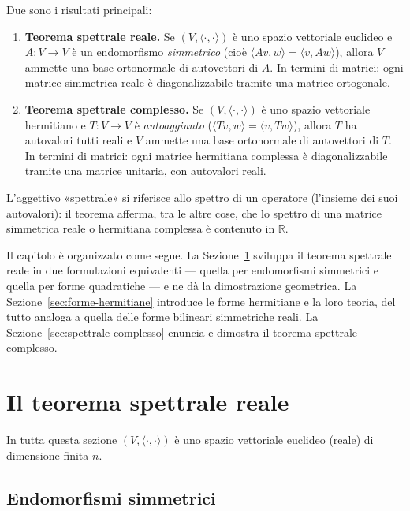 \documentclass[11pt, a4paper]{book}
\theoremstyle{definition}
\theoremstyle{plain}
\theoremstyle{remark}
\newcommand{\R}{\mathbb{R}}
\begin{document}
Due sono i risultati principali:

\begin{enumerate}
  \item \textbf{Teorema spettrale reale.} Se $(V,\langle\cdot,\cdot\rangle)$ è uno spazio vettoriale euclideo e $A \colon V \to V$ è un endomorfismo \emph{simmetrico} (cioè $\langle Av,w\rangle = \langle v,Aw\rangle$), allora $V$ ammette una base ortonormale di autovettori di $A$. In termini di matrici: ogni matrice simmetrica reale è diagonalizzabile tramite una matrice ortogonale.

  \item \textbf{Teorema spettrale complesso.} Se $(V,\langle\cdot,\cdot\rangle)$ è uno spazio vettoriale hermitiano e $T \colon V \to V$ è \emph{autoaggiunto} ($\langle Tv,w\rangle = \langle v,Tw\rangle$), allora $T$ ha autovalori tutti reali e $V$ ammette una base ortonormale di autovettori di $T$. In termini di matrici: ogni matrice hermitiana complessa è diagonalizzabile tramite una matrice unitaria, con autovalori reali.
\end{enumerate}

L'aggettivo «spettrale» si riferisce allo spettro di un operatore (l'insieme dei suoi autovalori): il teorema afferma, tra le altre cose, che lo spettro di una matrice simmetrica reale o hermitiana complessa è contenuto in $\R$.

Il capitolo è organizzato come segue. La Sezione~\ref{sec:spettrale-reale} sviluppa il teorema spettrale reale in due formulazioni equivalenti --- quella per endomorfismi simmetrici e quella per forme quadratiche --- e ne dà la dimostrazione geometrica. La Sezione~\ref{sec:forme-hermitiane} introduce le forme hermitiane e la loro teoria, del tutto analoga a quella delle forme bilineari simmetriche reali. La Sezione~\ref{sec:spettrale-complesso} enuncia e dimostra il teorema spettrale complesso.

\section{Il teorema spettrale reale}
\label{sec:spettrale-reale}

In tutta questa sezione $(V,\langle\cdot,\cdot\rangle)$ è uno spazio vettoriale euclideo (reale) di dimensione finita $n$.

\subsection{Endomorfismi simmetrici}
\end{document}
